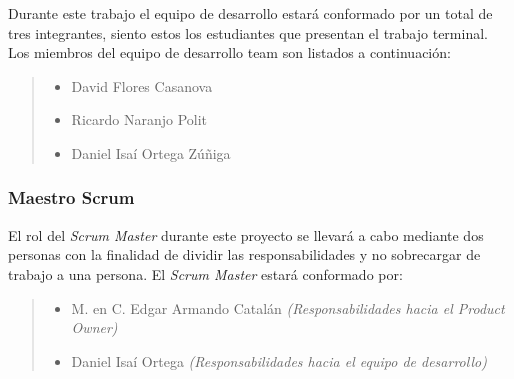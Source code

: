  Durante este trabajo el equipo de desarrollo estará conformado por un total de
 tres integrantes, siento estos los estudiantes que presentan el trabajo terminal. Los miembros del
 equipo de desarrollo team son listados a continuación:

    \begin{quote}
    \begin{itemize}
        \item David Flores Casanova
        \item Ricardo Naranjo Polit
        \item Daniel Isaí Ortega Zúñiga
    \end{itemize}
    \end{quote}






\subsubsection{Maestro Scrum}

 El rol del {\it Scrum Master} durante este proyecto se llevará a cabo mediante
 dos personas con la finalidad de dividir las responsabilidades y no sobrecargar de trabajo
 a una persona. El {\it Scrum Master} estará conformado por:

    \begin{quote}
    \begin{itemize}
        \item M. en C. Edgar Armando Catalán {\it (Responsabilidades hacia el Product Owner)}
        \item Daniel Isaí Ortega {\it(Responsabilidades hacia el equipo de desarrollo)}
    \end{itemize}
    \end{quote}


